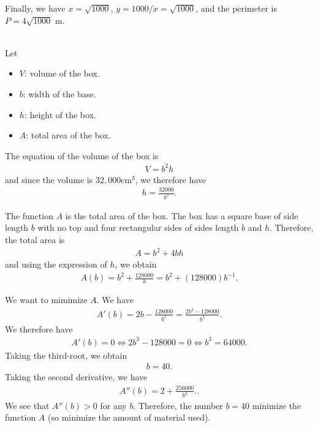 	Finally, we have $x = \sqrt{1000}$, $y= 1000/x = \sqrt{1000}$, and the perimeter is $P = 4 \sqrt{1000} \text{ m}$.
	
	\spc
	
	\\
	Let
		\begin{itemize}
		\item $V$: volume of the box.
		\item $b$: width of the base.
		\item $h$: height of the box.
		\item $A$: total area of the box.
		\end{itemize}	
	
	The equation of the volume of the box is
		\begin{align*}
		V = b^2 h
		\end{align*}	
	and since the volume is $32, 000\mathrm{cm}^3$, we therefore have
		\begin{align*}
		h = \frac{32000}{b^2} .
		\end{align*}	
		
	The function $A$ is the total area of the box. The box has a square base of side length $b$ with no top and four rectangular sides of sides length $b$ and $h$. Therefore, the total area is	
		\begin{align*}
		A = b^2 + 4 bh
		\end{align*}
	and using the expression of $h$, we obtain
		\begin{align*}
		A (b) = b^2 + \frac{128 000}{b} = b^2 + (128 000) b^{-1} .
		\end{align*}	
	
	We want to mimimize $A$. We have
		\begin{align*}
		A'(b) = 2b - \frac{128000}{b^2} = \frac{2b^3 - 128000}{b^2} .
		\end{align*}	
	We therefore have
		\begin{align*}
		A'(b) = 0 \iff 2b^3 - 128000 = 0 \iff b^3 = 64000 .
		\end{align*}
	Taking the third-root, we obtain
		\begin{align*}
		b = 40 .
		\end{align*}
	Taking the second derivative, we have
		\begin{align*}
		A''(b) = 2 + \frac{256000}{b^3} ..
		\end{align*}	
	We see that $A'' (b) > 0$ for any $b$. Therefore, the number $b= 40$ minimize the function $A$ (so minimize the amount of material used). 
	
